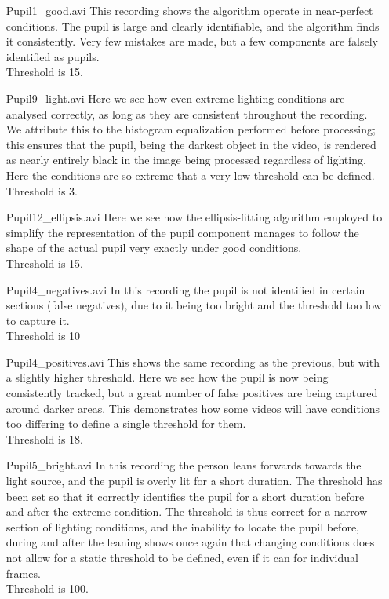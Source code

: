 \begin{itemize}
	\item[Pupil1\_good.avi] This recording shows the algorithm operate in near-perfect conditions. The pupil is large and clearly identifiable, and the algorithm finds it consistently. Very few mistakes are made, but a few components are falsely identified as pupils. \\Threshold is 15.
	\item[Pupil9\_light.avi] Here we see how even extreme lighting conditions are analysed correctly, as long as they are consistent throughout the recording. We attribute this to the histogram equalization performed before processing; this ensures that the pupil, being the darkest object in the video, is rendered as nearly entirely black in the image being processed regardless of lighting. Here the conditions are so extreme that a very low threshold can be defined.\\Threshold is 3.
	\item[Pupil12\_ellipsis.avi] Here we see how the ellipsis-fitting algorithm employed to simplify the representation of the pupil component manages to follow the shape of the actual pupil very exactly under good conditions.\\Threshold is 15.
	\item[Pupil4\_negatives.avi] In this recording the pupil is not identified in certain sections (false negatives), due to it being too bright and the threshold too low to capture it.\\Threshold is 10
	\item[Pupil4\_positives.avi] This shows the same recording as the previous, but with a slightly higher threshold. Here we see how the pupil is now being consistently tracked, but a great number of false positives are being captured around darker areas. This demonstrates how some videos will have conditions too differing to define a single threshold for them.\\Threshold is 18.
	\item[Pupil5\_bright.avi] In this recording the person leans forwards towards the light source, and the pupil is overly lit for a short duration. The threshold has been set so that it correctly identifies the pupil for a short duration before and after the extreme condition. The threshold is thus correct for a narrow section of lighting conditions, and the inability to locate the pupil before, during and after the leaning shows once again that changing conditions does not allow for a static threshold to be defined, even if it can for individual frames.\\Threshold is 100.

\end{itemize}
